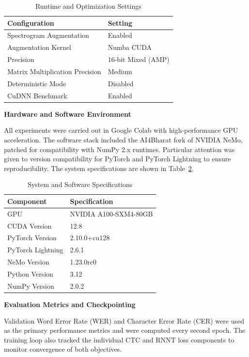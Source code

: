 \begin{table}[H]
\caption{Runtime and Optimization Settings}
\label{tab:indic_runtime}
\centering
\begin{tabular}{|l|l|}
\hline
\textbf{Configuration} & \textbf{Setting} \\
\hline
Spectrogram Augmentation & Enabled \\
Augmentation Kernel & Numba CUDA \\
Precision & 16-bit Mixed (AMP) \\
Matrix Multiplication Precision & Medium \\
Deterministic Mode & Disabled \\
CuDNN Benchmark & Enabled \\
\hline
\end{tabular}
\end{table}

\textbf{Hardware and Software Environment}

All experiments were carried out in Google Colab with high-performance GPU acceleration. The software stack included the AI4Bharat fork of NVIDIA NeMo, patched for compatibility with NumPy 2.x runtimes. Particular attention was given to version compatibility for PyTorch and PyTorch Lightning to ensure reproducibility. The system specifications are shown in Table~\ref{tab:indic_env}.

\begin{table}[H]
\caption{System and Software Specifications}
\label{tab:indic_env}
\centering
\begin{tabular}{|l|l|}
\hline
\textbf{Component} & \textbf{Specification} \\
\hline
GPU & NVIDIA A100-SXM4-80GB \\
CUDA Version & 12.8 \\
PyTorch Version & 2.10.0+cu128 \\
PyTorch Lightning & 2.6.1 \\
NeMo Version & 1.23.0rc0 \\
Python Version & 3.12 \\
NumPy Version & 2.0.2 \\
\hline
\end{tabular}
\end{table}

\textbf{Evaluation Metrics and Checkpointing}

Validation Word Error Rate (WER) and Character Error Rate (CER) were used as the primary performance metrics and were computed every second epoch. The training loop also tracked the individual CTC and RNNT loss components to monitor convergence of both objectives.

